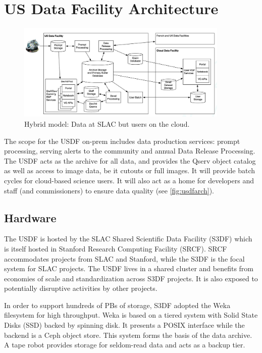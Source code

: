 \section {US Data Facility Architecture} \label{sec:usdfarch}


\begin{figure}
\begin{centering}
\includegraphics[width=0.9\textwidth]{hybrid}
	\caption{ Hybrid model: Data at SLAC but users on the cloud.  \label{fig:usdfarch}}
\end{centering}
\end{figure}

The scope for the USDF on-prem includes data production services:
prompt processing, serving alerts to the community and annual Data
Release Processing. The USDF acts as the archive for all data, and
provides the Qserv object catalog as well as access to image data, be
it cutouts or full images. It will provide batch cycles for cloud-based science users.
It will also act as a home for developers and staff (and
commissioners) to ensure data quality (see \autoref{fig:usdfarch}).


\subsection{Hardware}

The USDF is hosted by the SLAC Shared Scientific Data Facility
(S3DF) which is itself hosted in Stanford Research Computing Facility (SRCF).
SRCF accommodates projects from SLAC and Stanford, while the S3DF is the
focal system for SLAC projects. The USDF lives in a shared cluster and
benefits from economies of scale and standardization across S3DF
projects. It is also exposed to potentially disruptive activities by
other projects.

In order to support hundreds of PBs of storage, S3DF adopted the Weka
filesystem for high throughput. Weka is based on a tiered system with
Solid State Disks (SSD) backed by spinning disk. It presents a POSIX interface while the
backend is a Ceph object store. This system forms the basis of the
data archive. A tape robot provides storage for seldom-read data and
acts as a backup tier.

